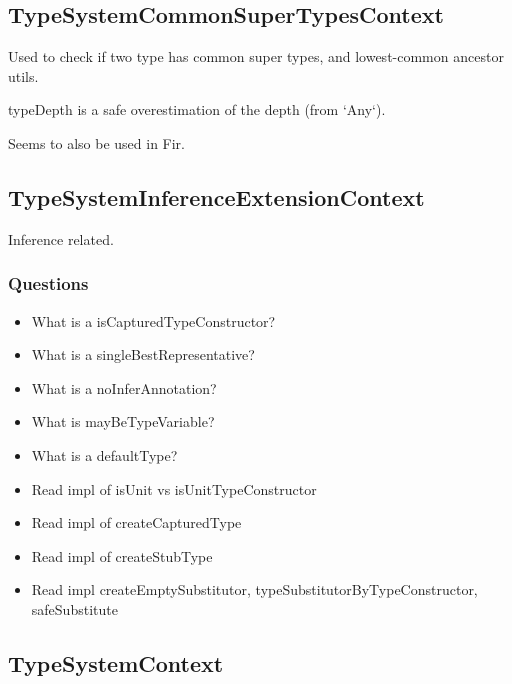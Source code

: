 \documentclass{article}
\begin{document}
\subsection{TypeSystemCommonSuperTypesContext}

Used to check if two type has common super types, and lowest-common ancestor utils.

typeDepth is a safe overestimation of the depth (from `Any`).

Seems to also be used in Fir.

\subsection{TypeSystemInferenceExtensionContext}

Inference related.

\subsubsection{Questions}
\begin{itemize}
    \item What is a isCapturedTypeConstructor?
    \item What is a singleBestRepresentative?
    \item What is a noInferAnnotation?
    \item What is mayBeTypeVariable?
    \item What is a defaultType?
    \item Read impl of isUnit vs isUnitTypeConstructor
    \item Read impl of createCapturedType
    \item Read impl of createStubType
    \item Read impl createEmptySubstitutor, typeSubstitutorByTypeConstructor, safeSubstitute
\end{itemize}

\subsection{TypeSystemContext}
\end{document}
